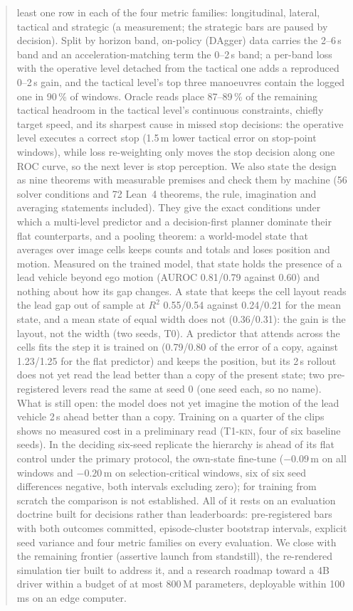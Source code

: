 \documentclass[10pt,twocolumn]{article}
\theoremstyle{remark}
\newcommand{\tier}[1]{\textsc{\small #1}}
\begin{document}
\begin{abstract}
least one row in each of the four metric families: longitudinal, lateral, tactical and strategic (a measurement; the strategic bars are paused by decision). Split by horizon band, on-policy (DAgger) data carries the 2--6\,s band and an acceleration-matching term the 0--2\,s band; a per-band loss with the operative level detached from the tactical one adds a reproduced 0--2\,s gain, and the tactical level's top three manoeuvres contain the logged one in 90\,\% of windows. Oracle reads place 87--89\,\% of the remaining tactical headroom in the tactical level's continuous constraints, chiefly target speed, and its sharpest cause in missed stop decisions: the operative level executes a correct stop (1.5\,m lower tactical error on stop-point windows), while loss re-weighting only moves the stop decision along one ROC curve, so the next lever is stop perception. We also state the design as nine theorems with measurable premises and check them by machine (56 solver conditions and 72 Lean~4 theorems, the rule, imagination and averaging statements included). They give the exact conditions under which a multi-level predictor and a decision-first planner dominate their flat counterparts, and a pooling theorem: a world-model state that averages over image cells keeps counts and totals and loses position and motion. Measured on the trained model, that state holds the presence of a lead vehicle beyond ego motion (AUROC 0.81/0.79 against 0.60) and nothing about how its gap changes. A state that keeps the cell layout reads the lead gap out of sample at $R^2$ 0.55/0.54 against 0.24/0.21 for the mean state, and a mean state of equal width does not (0.36/0.31): the gain is the layout, not the width (two seeds, \tier{T0}). A predictor that attends across the cells fits the step it is trained on (0.79/0.80 of the error of a copy, against 1.23/1.25 for the flat predictor) and keeps the position, but its 2\,s rollout does not yet read the lead better than a copy of the present state; two pre-registered levers read the same at seed 0 (one seed each, so no name). What is still open: the model does not yet imagine the motion of the lead vehicle 2\,s ahead better than a copy. Training on a quarter of the clips shows no measured cost in a preliminary read (\tier{T1-kin}, four of six baseline seeds). In the deciding six-seed replicate the hierarchy is ahead of its flat control under the primary protocol, the own-state fine-tune ($-0.09$\,m on all windows and $-0.20$\,m on selection-critical windows, six of six seed differences negative, both intervals excluding zero); for training from scratch the comparison is not established. All of it rests on an evaluation
doctrine built for decisions rather than leaderboards: pre-registered bars with both outcomes committed, episode-cluster bootstrap
intervals, explicit seed variance and four metric families on every evaluation. We close with the remaining frontier (assertive
launch from standstill), the re-rendered simulation tier built to address it, and a research roadmap toward a 4B driver within a
budget of at most 800\,M parameters, deployable within 100\,ms on an edge computer.
\end{abstract}
\end{document}

